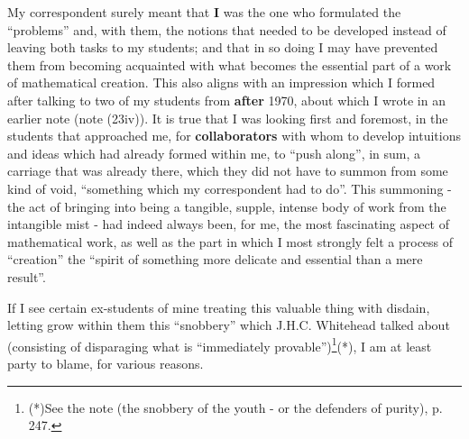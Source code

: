My correspondent surely meant that \textbf{I} was the one who formulated the ``problems''
and, with them, the notions that needed to be developed instead of 
leaving both tasks to my students; and that in so doing I may have 
prevented them from becoming acquainted with what becomes the essential part of a work of
mathematical creation. This also aligns with an 
impression which I formed after talking
to two of my students from \textbf{after} 1970, about which I wrote in an earlier note
(note (23iv)).
It is true that I was looking first and foremost, in the students that approached me, 
for \textbf{collaborators} 
with whom to develop intuitions and ideas which had already formed within me, 
to ``push along'', in sum, a carriage that was already there, which they did not have to
summon from some kind of void, ``something which my correspondent had to do''.
This summoning - the act of bringing into being a tangible, supple, 
intense body of work from the intangible mist - had indeed always been, for me, the most
fascinating aspect of mathematical work, as well as the part in which I most strongly felt
a process of ``creation'' the ``spirit
of something more delicate and essential than a mere result''.

If I see certain ex-students of mine treating this valuable thing with disdain, 
letting grow within them
this ``snobbery'' which J.H.C. Whitehead talked about (consisting of disparaging 
what is ``immediately provable'')\footnote{(*)See the note (the snobbery of the youth - or
the defenders of purity),  p. 247.}(*), 
I am at least party to blame, for various reasons. 


